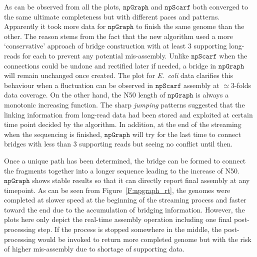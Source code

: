 \documentclass[10pt,twocolumn,twoside]{genpaper}
\newcommand{\npscarf}{$\mathtt{npScarf}$}
\newcommand{\npgraph}{$\mathtt{npGraph}$}
\newcommand{\ec}{\emph{E.~coli}}
\begin{document}
As can be observed from all the plots, \npgraph{} and \npscarf{} both converged to the same ultimate completeness but with different paces and patterns.
Apparently it took more data for \npgraph{} to finish the same genome than the other.
The reason stems from the fact that the new algorithm used a more `conservative' approach of bridge construction with at least 3 supporting long-reads for each to prevent any potential mis-assembly. 
Unlike \npscarf{} when the connections could be undone and rectified later if needed, a bridge in \npgraph{} will remain unchanged once created.
The plot for \ec{} data clarifies this behaviour when a fluctuation can be observed in \npscarf{} assembly at $\simeq 3$-folds data coverage.
On the other hand, the N50 length of \npgraph{} is always a monotonic increasing function. 
The sharp \emph{jumping} patterns suggested that the linking information from long-read data had been stored and exploited at certain time point decided by the algorithm. 
In addition, at the end of the streaming when the sequencing is finished, \npgraph{} will try for the last time to connect bridges with less than 3 supporting reads but seeing no conflict until then.

Once a unique path has been determined, the bridge can be formed to connect the fragments together into a longer sequence leading to the increase of N50. \npgraph{} shows stable results so that it can directly report final assembly at any timepoint. As can be seen from Figure~\ref{F:npgraph_rt}, the genomes were completed at slower speed at the beginning of the streaming process and faster toward the end due to the accumulation of bridging information. 
However, the plots here only depict the real-time assembly operation including one final post-processing step. If the process is stopped somewhere in the middle, the post-processing would be invoked to return more completed genome but with the risk of higher mis-assembly due to shortage of supporting data.
\end{document}
